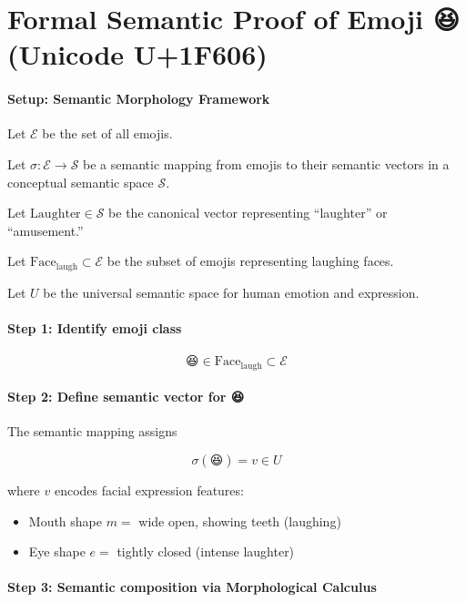 \documentclass{article}
\begin{document}
\section*{Formal Semantic Proof of Emoji 😆 (Unicode U+1F606)}

\paragraph{Setup: Semantic Morphology Framework}

Let $\mathcal{E}$ be the set of all emojis.

Let $\sigma : \mathcal{E} \to \mathcal{S}$ be a semantic mapping from emojis to their semantic vectors in a conceptual semantic space $\mathcal{S}$.

Let $\mathrm{Laughter} \in \mathcal{S}$ be the canonical vector representing ``laughter'' or ``amusement.''

Let $\mathrm{Face}_{\mathrm{laugh}} \subset \mathcal{E}$ be the subset of emojis representing laughing faces.

Let $U$ be the universal semantic space for human emotion and expression.

\paragraph{Step 1: Identify emoji class}

\[
\text{😆} \in \mathrm{Face}_{\mathrm{laugh}} \subset \mathcal{E}
\]

\paragraph{Step 2: Define semantic vector for 😆}

The semantic mapping assigns

\[
\sigma(\text{😆}) = v \in U
\]

where $v$ encodes facial expression features:  
\begin{itemize}
    \item Mouth shape $m = $ wide open, showing teeth (laughing)
    \item Eye shape $e = $ tightly closed (intense laughter)
\end{itemize}

\paragraph{Step 3: Semantic composition via Morphological Calculus}
\end{document}
